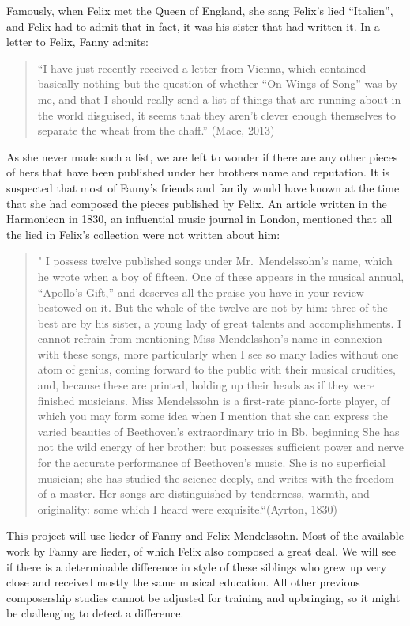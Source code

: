 \documentclass[12pt,twoside]{reedthesis}
\theoremstyle{definition}
\theoremstyle{definition}
\theoremstyle{definition}
\theoremstyle{remark}
\begin{document}
Famously, when Felix met the Queen of England, she sang Felix's lied
``Italien'', and Felix had to admit that in fact, it was his sister that
had written it. In a letter to Felix, Fanny admits:
\begin{quote}
``I have just recently received a letter from Vienna, which contained
basically nothing but the question of whether ``On Wings of Song'' was
by me, and that I should really send a list of things that are running
about in the world disguised, it seems that they aren't clever enough
themselves to separate the wheat from the chaff.'' (Mace, 2013)
\end{quote}
As she never made such a list, we are left to wonder if there are any
other pieces of hers that have been published under her brothers name
and reputation. It is suspected that most of Fanny's friends and family
would have known at the time that she had composed the pieces published
by Felix. An article written in the Harmonicon in 1830, an influential
music journal in London, mentioned that all the lied in Felix's
collection were not written about him:
\begin{quote}
" I possess twelve published songs under Mr.~Mendelssohn's name, which
he wrote when a boy of fifteen. One of these appears in the musical
annual, ``Apollo's Gift,'' and deserves all the praise you have in your
review bestowed on it. But the whole of the twelve are not by him: three
of the best are by his sister, a young lady of great talents and
accomplishments. I cannot refrain from mentioning Miss Mendelsshon's
name in connexion with these songs, more particularly when I see so many
ladies without one atom of genius, coming forward to the public with
their musical crudities, and, because these are printed, holding up
their heads as if they were finished musicians. Miss Mendelssohn is a
first-rate piano-forte player, of which you may form some idea when I
mention that she can express the varied beauties of Beethoven's
extraordinary trio in Bb, beginning She has not the wild energy of her
brother; but possesses sufficient power and nerve for the accurate
performance of Beethoven's music. She is no superficial musician; she
has studied the science deeply, and writes with the freedom of a master.
Her songs are distinguished by tenderness, warmth, and originality: some
which I heard were exquisite.``(Ayrton, 1830)
\end{quote}
This project will use lieder of Fanny and Felix Mendelssohn. Most of the
available work by Fanny are lieder, of which Felix also composed a great
deal. We will see if there is a determinable difference in style of
these siblings who grew up very close and received mostly the same
musical education. All other previous composership studies cannot be
adjusted for training and upbringing, so it might be challenging to
detect a difference.
\end{document}
